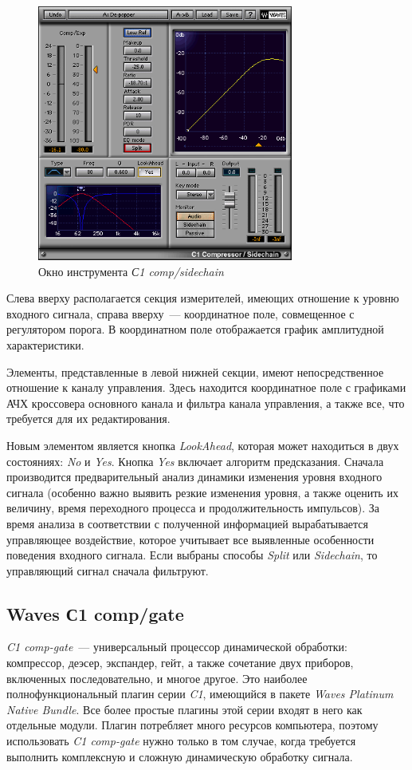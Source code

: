 \documentclass[oneside, final, 14pt]{extreport}
\begin{document}
\begin{figure}[ht!]
  \centering
  \includegraphics[width=0.75\textwidth]{pic-wavescomp-06}
  \caption{Окно инструмента \emph{С1 comp/sidechain}}
  \label{pic-wavescomp-06}
\end{figure}

Слева вверху располагается секция измерителей, имеющих отношение к уровню входного сигнала, справа вверху~--- координатное поле, совмещенное с регулятором порога. В координатном поле отображается график амплитудной характеристики. 

Элементы, представленные в левой нижней секции, имеют непосредственное отношение к каналу управления. Здесь находится координатное поле с графиками АЧХ кроссовера основного канала и фильтра канала управления, а также все, что требуется для их редактирования.

Новым элементом является кнопка \emph{LookAhead}, которая может находиться в двух состояниях: \emph{No} и \emph{Yes}. Кнопка \emph{Yes} включает алгоритм предсказания. Сначала производится предварительный анализ динамики изменения уровня входного сигнала (особенно важно выявить резкие изменения уровня, а также оценить их величину, время переходного процесса и продолжительность импульсов). За время анализа в соответствии с полученной информацией вырабатывается управляющее воздействие, которое учитывает все выявленные особенности поведения входного сигнала. Если выбраны способы \emph{Split} или \emph{Sidechain}, то управляющий сигнал сначала фильтруют.

\subsection{Waves С1 comp/gate}
\emph{C1 comp-gate}~--- универсальный процессор динамической обработки: компрессор, деэсер, экспандер, гейт, а также сочетание двух приборов, включенных последовательно, и многое другое. Это наиболее полнофункциональный плагин серии \emph{C1}, имеющийся в пакете \emph{Waves Platinum Native Bundle}. Все более простые плагины этой серии входят в него как отдельные модули. Плагин потребляет много ресурсов компьютера, поэтому использовать \emph{C1 comp-gate} нужно только в том случае, когда требуется выполнить комплексную и сложную динамическую обработку сигнала.
\end{document}
